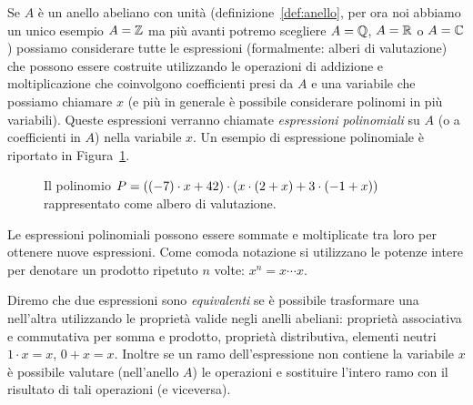 Se $A$ è un anello abeliano con unità 
(definizione~\ref{def:anello}, per ora noi abbiamo un unico esempio $A={\mathbb Z}$ ma più avanti potremo scegliere 
$A={\mathbb Q}$, $A={\mathbb R}$ o $A={\mathbb C}$)
possiamo considerare tutte le espressioni
(formalmente: alberi di valutazione)
che possono essere costruite utilizzando le operazioni
di addizione e moltiplicazione che coinvolgono coefficienti presi da $A$
e una variabile che possiamo chiamare $x$ 
(e più in generale è possibile considerare polinomi in più variabili).
Queste espressioni verranno chiamate \emph{espressioni polinomiali}%
%
 su $A$
(o a coefficienti in $A$) nella variabile $x$. 
Un esempio di espressione polinomiale
è riportato in Figura~\ref{fig:49389}.
\begin{figure}
\begin{center}
\end{center}
\caption{Il polinomio $P = {\left( (-7)\cdot x + 42 \right)}\cdot(x\cdot (2+x) + 3\cdot(-1+x))$
rappresentato come albero di valutazione.}
\label{fig:49389}%
\end{figure}
Le espressioni polinomiali possono essere sommate e moltiplicate tra loro 
per ottenere nuove espressioni. 
Come comoda notazione si utilizzano le potenze intere per 
denotare un prodotto ripetuto $n$ volte: $x^n = x\cdots x$.

Diremo che due espressioni sono \emph{equivalenti} se è possibile trasformare 
una nell'altra utilizzando le proprietà valide negli anelli abeliani: 
proprietà associativa 
e commutativa per somma e prodotto, proprietà distributiva, elementi 
neutri $1\cdot x = x$, $0 + x = x$.
Inoltre se un ramo dell'espressione non contiene la variabile $x$ è possibile valutare 
(nell'anello $A$) le operazioni e sostituire l'intero ramo con il 
risultato di tali operazioni (e viceversa).

